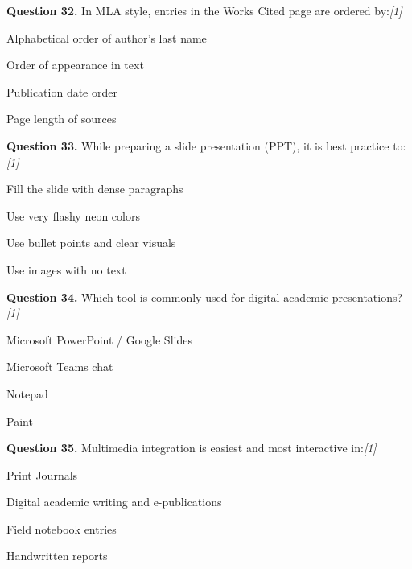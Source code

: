 \documentclass[11pt,a4paper]{article}
\newcommand{\pts}[1]{\hfill   \textit{[#1]}}
\begin{document}
\noindent   \textbf{Question 32.} In MLA style, entries in the Works Cited page are ordered by:\pts{1}

\begin{parts}
  \item Alphabetical order of author's last name
  \item Order of appearance in text
  \item Publication date order
  \item Page length of sources
\end{parts}

\medskip




\noindent   \textbf{Question 33.} While preparing a slide presentation (PPT), it is best practice to:\pts{1}

\begin{parts}
  \item Fill the slide with dense paragraphs
  \item Use very flashy neon colors
  \item Use bullet points and clear visuals
  \item Use images with no text
\end{parts}

\medskip




\noindent   \textbf{Question 34.} Which tool is commonly used for digital academic presentations?\pts{1}

\begin{parts}
  \item Microsoft PowerPoint / Google Slides
  \item Microsoft Teams chat
  \item Notepad
  \item Paint
\end{parts}

\medskip




\noindent   \textbf{Question 35.} Multimedia integration is easiest and most interactive in:\pts{1}

\begin{parts}
  \item Print Journals
  \item Digital academic writing and e-publications
  \item Field notebook entries
  \item Handwritten reports
\end{parts}
\end{document}
